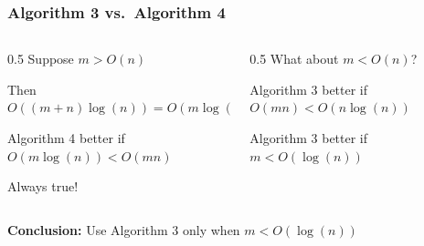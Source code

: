 \documentclass[aspectratio=169,hyperref={bookmarks=false,urlcolor=blue,colorlinks=true},10pt]{beamer}
\begin{document}
\begin{frame}
  \frametitle{Algorithm 3 vs.\ Algorithm 4}

  \begin{columns}[t]
    \begin{column}{0.5\textwidth}
      Suppose $m > O(n)$

      \vspace{\baselineskip}

      Then $O((m+n)\log(n)) = O(m\log(n))$

      \vspace{\baselineskip}

      Algorithm 4 better if $O(m\log(n)) < O(mn)$

      \vspace{\baselineskip}

      Always true!
    \end{column}
    \begin{column}{0.5\textwidth}
      \pause
      What about $m < O(n)$?

      \vspace{\baselineskip}

      Algorithm 3 better if $O(mn) < O(n\log(n))$

      \vspace{\baselineskip}

      Algorithm 3 better if $m < O(\log(n))$
    \end{column}
  \end{columns}

  \vspace{3\baselineskip}

  \pause
  \textbf{Conclusion:} Use Algorithm 3 only when $m < O(\log(n))$
\end{frame}
\end{document}
